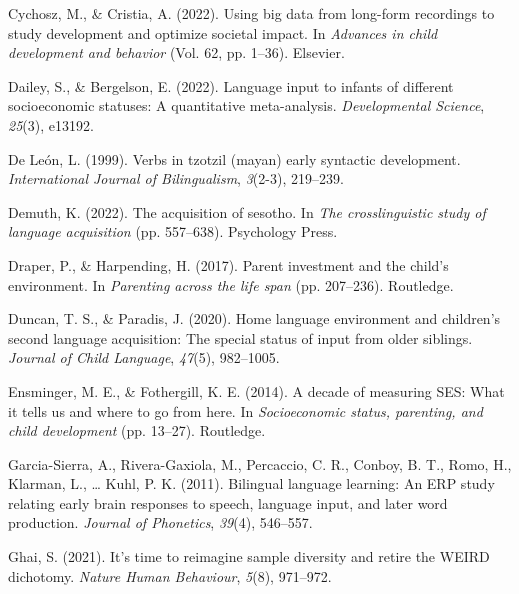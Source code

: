 \documentclass[
  man,floatsintext]{apa6}
\newlength{\cslhangindent}
\newlength{\cslentryspacingunit} %
\newenvironment{CSLReferences}[2] %
 {%
  \setlength{\parindent}{0pt}
  \ifodd #1
  \let\oldpar\par
  \def\par{\hangindent=\cslhangindent\oldpar}
  \fi
  \setlength{\parskip}{#2\cslentryspacingunit}
 }%
 {}
\begin{document}
\begin{CSLReferences}{1}{0}
\leavevmode{}%
Cychosz, M., \& Cristia, A. (2022). Using big data from long-form recordings to study development and optimize societal impact. In \emph{Advances in child development and behavior} (Vol. 62, pp. 1--36). Elsevier.

\leavevmode{}%
Dailey, S., \& Bergelson, E. (2022). Language input to infants of different socioeconomic statuses: A quantitative meta-analysis. \emph{Developmental Science}, \emph{25}(3), e13192.

\leavevmode{}%
De León, L. (1999). Verbs in tzotzil (mayan) early syntactic development. \emph{International Journal of Bilingualism}, \emph{3}(2-3), 219--239.

\leavevmode{}%
Demuth, K. (2022). The acquisition of sesotho. In \emph{The crosslinguistic study of language acquisition} (pp. 557--638). Psychology Press.

\leavevmode{}%
Draper, P., \& Harpending, H. (2017). Parent investment and the child's environment. In \emph{Parenting across the life span} (pp. 207--236). Routledge.

\leavevmode{}%
Duncan, T. S., \& Paradis, J. (2020). Home language environment and children's second language acquisition: The special status of input from older siblings. \emph{Journal of Child Language}, \emph{47}(5), 982--1005.

\leavevmode{}%
Ensminger, M. E., \& Fothergill, K. E. (2014). A decade of measuring SES: What it tells us and where to go from here. In \emph{Socioeconomic status, parenting, and child development} (pp. 13--27). Routledge.

\leavevmode{}%
Garcia-Sierra, A., Rivera-Gaxiola, M., Percaccio, C. R., Conboy, B. T., Romo, H., Klarman, L., \ldots{} Kuhl, P. K. (2011). Bilingual language learning: An ERP study relating early brain responses to speech, language input, and later word production. \emph{Journal of Phonetics}, \emph{39}(4), 546--557.

\leavevmode{}%
Ghai, S. (2021). It's time to reimagine sample diversity and retire the WEIRD dichotomy. \emph{Nature Human Behaviour}, \emph{5}(8), 971--972.


\end{CSLReferences}
\end{document}
